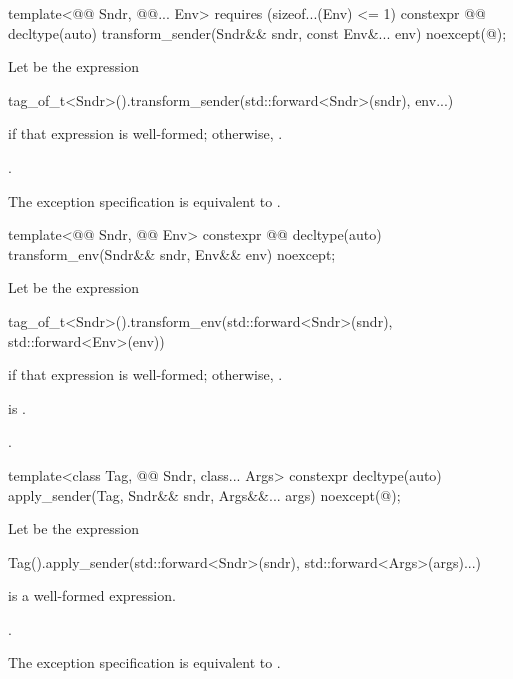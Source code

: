 %
\begin{itemdecl}
template<@@ Sndr, @@... Env>
  requires (sizeof...(Env) <= 1)
constexpr @@ decltype(auto) transform_sender(Sndr&& sndr, const Env&... env)
  noexcept(@\seebelow@);
\end{itemdecl}

\begin{itemdescr}
\pnum
Let  be the expression
\begin{codeblock}
tag_of_t<Sndr>().transform_sender(std::forward<Sndr>(sndr), env...)
\end{codeblock}
if that expression is well-formed;
otherwise, .

\pnum
\returns
{}.

\pnum
\remarks
The exception specification is equivalent to .
\end{itemdescr}

%
\begin{itemdecl}
template<@@ Sndr, @@ Env>
  constexpr @@ decltype(auto) transform_env(Sndr&& sndr, Env&& env) noexcept;
\end{itemdecl}

\begin{itemdescr}
\pnum
Let  be the expression
\begin{codeblock}
tag_of_t<Sndr>().transform_env(std::forward<Sndr>(sndr), std::forward<Env>(env))
\end{codeblock}
if that expression is well-formed;
otherwise, .

\pnum
\mandates
{} is .

\pnum
\returns
{}.
\end{itemdescr}

%
\begin{itemdecl}
template<class Tag, @@ Sndr, class... Args>
constexpr decltype(auto) apply_sender(Tag, Sndr&& sndr, Args&&... args)
  noexcept(@\seebelow@);
\end{itemdecl}

\begin{itemdescr}
\pnum
Let  be the expression
\begin{codeblock}
  Tag().apply_sender(std::forward<Sndr>(sndr), std::forward<Args>(args)...)
\end{codeblock}

\pnum
\constraints
{} is a well-formed expression.

\pnum
\returns
{}.

\pnum
\remarks
The exception specification is equivalent to .
\end{itemdescr}

